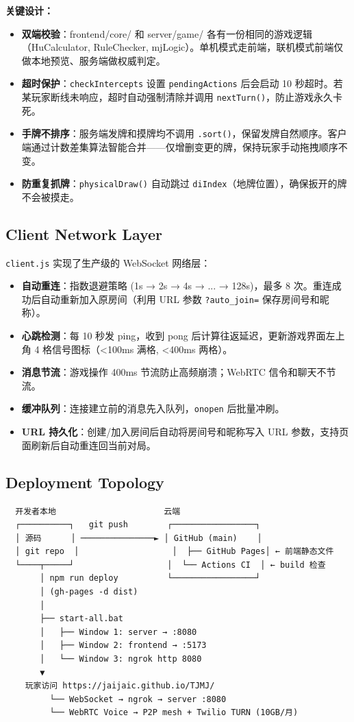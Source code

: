 \documentclass[11pt,a4paper]{article}
\begin{document}
\textbf{关键设计：}
\begin{itemize}[nosep]
  \item \textbf{双端校验}：frontend/core/ 和 server/game/ 各有一份相同的游戏逻辑（HuCalculator, RuleChecker, mjLogic）。单机模式走前端，联机模式前端仅做本地预览、服务端做权威判定。
  \item \textbf{超时保护}：\texttt{checkIntercepts} 设置 \texttt{pendingActions} 后会启动 10 秒超时。若某玩家断线未响应，超时自动强制清除并调用 \texttt{nextTurn()}，防止游戏永久卡死。
  \item \textbf{手牌不排序}：服务端发牌和摸牌均不调用 \texttt{.sort()}，保留发牌自然顺序。客户端通过计数差集算法智能合并——仅增删变更的牌，保持玩家手动拖拽顺序不变。
  \item \textbf{防重复抓牌}：\texttt{physicalDraw()} 自动跳过 \texttt{diIndex}（地牌位置），确保扳开的牌不会被摸走。
\end{itemize}

\subsection{Client Network Layer}

\texttt{client.js} 实现了生产级的 WebSocket 网络层：

\begin{itemize}[nosep]
  \item \textbf{自动重连}：指数退避策略 (1s → 2s → 4s → ... → 128s)，最多 8 次。重连成功后自动重新加入原房间（利用 URL 参数 \texttt{?auto\_join=} 保存房间号和昵称）。
  \item \textbf{心跳检测}：每 10 秒发 ping，收到 pong 后计算往返延迟，更新游戏界面左上角 4 格信号图标（<100ms 满格, <400ms 两格）。
  \item \textbf{消息节流}：游戏操作 400ms 节流防止高频崩溃；WebRTC 信令和聊天不节流。
  \item \textbf{缓冲队列}：连接建立前的消息先入队列，\texttt{onopen} 后批量冲刷。
  \item \textbf{URL 持久化}：创建/加入房间后自动将房间号和昵称写入 URL 参数，支持页面刷新后自动重连回当前对局。
\end{itemize}

\subsection{Deployment Topology}

\begin{verbatim}
  开发者本地                      云端
  ┌──────────┐   git push        ┌─────────────────┐
  │ 源码      │ ───────────────► │ GitHub (main)    │
  │ git repo  │                   │  ├── GitHub Pages│ ← 前端静态文件
  └────┬─────┘                   │  └── Actions CI  │ ← build 检查
       │ npm run deploy          └─────────────────┘
       │ (gh-pages -d dist)
       │
       ├── start-all.bat
       │   ├── Window 1: server → :8080
       │   ├── Window 2: frontend → :5173
       │   └── Window 3: ngrok http 8080
       ▼
    玩家访问 https://jaijaic.github.io/TJMJ/
         └── WebSocket → ngrok → server :8080
         └── WebRTC Voice → P2P mesh + Twilio TURN (10GB/月)
\end{verbatim}
\end{document}
